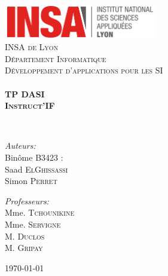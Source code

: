 \begin{titlepage}
\begin{center}

\includegraphics[width=0.5\textwidth]{./logo.png}~\\[2.5cm]

\textsc{\LARGE INSA de Lyon}\\[0.5cm]
\textsc{\Large Département Informatique}\\[0.5cm]
\textsc{\LARGE Développement d'applications pour les SI}\\[1.5cm]

\HRule \\[0.4cm]

{\huge \bfseries TP DASI \\
\textsc{Instruct'IF} \\[0.4cm] }

\HRule \\[1.5cm]

\begin{minipage}{0.4\textwidth}
\begin{flushleft} \large
\emph{Auteurs:}\\
Binôme B3423 :\\
Saad \textsc{ElGhissassi}\\
Simon \textsc{Perret}\\
\end{flushleft}
\end{minipage}
\begin{minipage}{0.4\textwidth}
\begin{flushright} \large
\emph{Professeurs:} \\
Mme. \textsc{Tchounikine}\\
Mme. \textsc{Servigne}\\
M. \textsc{Duclos}\\
M. \textsc{Gripay}\\
\end{flushright}
\end{minipage}

\vspace{2.5cm}
\setcounter{tocdepth}{1}
\tableofcontents
\vfill
{\large \today}

\end{center}
\end{titlepage}